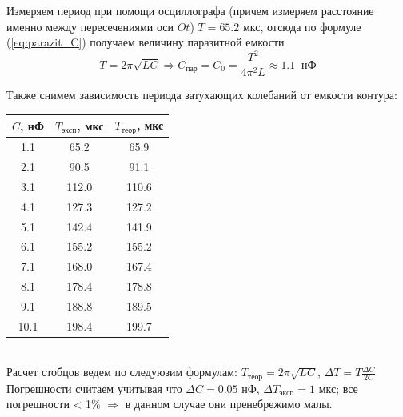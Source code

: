 \documentclass[a4paper,12pt]{extarticle}
\begin{document}
Измеряем период при помощи осциллографа (причем измеряем расстояние именно между пересечениями оси $Ot$) $T = 65.2$ мкс, отсюда по формуле (\ref{eq:parazit_C}) получаем величину паразитной емкости 
\begin{equation}
    T = 2\pi \sqrt{LC} \Rightarrow C_{\text{пар}} = C_0 = \frac{T^2}{4\pi^2 L} \approx 1.1\;\;\text{нФ}
    \label{eq:parazit_C}
\end{equation}

Также снимем зависимость периода затухающих колебаний от емкости контура: \\
\begin{tabular}{|c|c|c|}
\hline
$C$, нФ & $T_{\text{эксп}}$, мкс & $T_{\text{теор}}$, мкс   \\ \hline
1.1  & 65.2  & 65.9  \\ \hline
2.1  & 90.5  & 91.1  \\ \hline
3.1  & 112.0   & 110.6 \\ \hline
4.1  & 127.3 & 127.2 \\ \hline
5.1  & 142.4 & 141.9 \\ \hline
6.1  & 155.2 & 155.2 \\ \hline
7.1  & 168.0   & 167.4 \\ \hline
8.1  & 178.4 & 178.8 \\ \hline
9.1  & 188.8 & 189.5 \\ \hline
10.1 & 198.4 & 199.7 \\ \hline
\end{tabular}\label{tb:T(C)_zatuh_koleb}
\begin{minipage}{1\textwidth}
    \end{minipage}
\\
Расчет стобцов ведем по следуюзим формулам: $T_{\text{теор}} = 2\pi \sqrt{LC}$, $\Delta T = T \frac{\Delta C}{2C}$\\
Погрешности считаем учитывая что $\Delta C = 0.05$ нФ, $\Delta T_{\text{эксп}} = 1$ мкс; все погрешности < 1\% $ \Rightarrow$ в данном случае они пренебрежимо малы.
\end{document}
